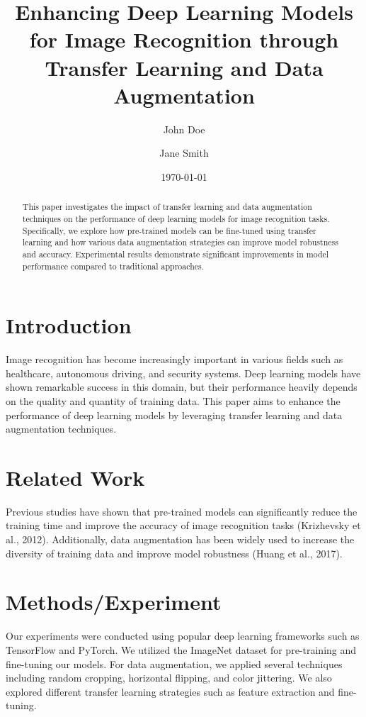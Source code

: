 \documentclass{article}
\title{Enhancing Deep Learning Models for Image Recognition through Transfer Learning and Data Augmentation}
\author{John Doe \and Jane Smith}
\date{\today}
\begin{document}
\maketitle

\begin{abstract}
This paper investigates the impact of transfer learning and data augmentation techniques on the performance of deep learning models for image recognition tasks. Specifically, we explore how pre-trained models can be fine-tuned using transfer learning and how various data augmentation strategies can improve model robustness and accuracy. Experimental results demonstrate significant improvements in model performance compared to traditional approaches.
\end{abstract}

\section{Introduction}
Image recognition has become increasingly important in various fields such as healthcare, autonomous driving, and security systems. Deep learning models have shown remarkable success in this domain, but their performance heavily depends on the quality and quantity of training data. This paper aims to enhance the performance of deep learning models by leveraging transfer learning and data augmentation techniques.

\section{Related Work}
Previous studies have shown that pre-trained models can significantly reduce the training time and improve the accuracy of image recognition tasks (Krizhevsky et al., 2012). Additionally, data augmentation has been widely used to increase the diversity of training data and improve model robustness (Huang et al., 2017).

\section{Methods/Experiment}
Our experiments were conducted using popular deep learning frameworks such as TensorFlow and PyTorch. We utilized the ImageNet dataset for pre-training and fine-tuning our models. For data augmentation, we applied several techniques including random cropping, horizontal flipping, and color jittering. We also explored different transfer learning strategies such as feature extraction and fine-tuning.
\end{document}
